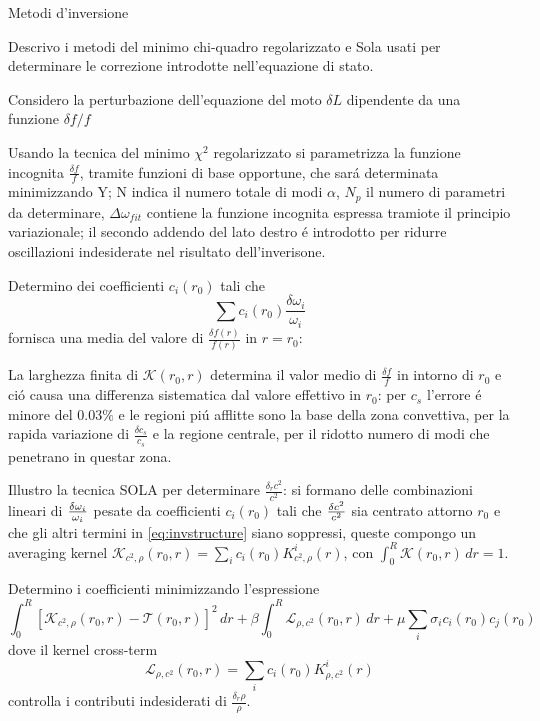 \documentclass[10pt,xcolor={usenames},fleqn,mathserif,serif]{beamer}
\begin{document}
\begin{wordonframe}{Metodi d'inversione}

Descrivo i metodi del minimo chi-quadro regolarizzato e Sola usati per determinare le correzione introdotte nell'equazione di stato.

Considero la perturbazione dell'equazione del moto $\delta L$ dipendente da una funzione $\delta f/f$

Usando la tecnica del minimo $\chi^2$ regolarizzato si parametrizza la funzione incognita $\frac{\delta f}{f}$, tramite funzioni di base opportune, che sar\'a determinata minimizzando Y; N indica il numero totale di modi $\alpha$, $N_p$ il numero di parametri da determinare, $\Delta\omega_{fit}$ contiene la funzione incognita espressa tramiote il principio variazionale; il secondo addendo del lato destro \'e introdotto per ridurre oscillazioni indesiderate nel risultato dell'inverisone.


Determino dei coefficienti $c_i(r_0)$ tali che \[\sum c_i(r_0)\frac{\delta\omega_i}{\omega_i}\] fornisca una media del valore di $\frac{\delta f(r)}{f(r)}$ in $r=r_0$:

La larghezza finita di $\mathcal{K}(r_0,r)$ determina il valor medio di $\frac{\delta f}{f}$ in intorno di $r_0$ e ci\'o causa una differenza sistematica  dal valore effettivo in $r_0$: per $c_s$ l'errore \'e minore del $0.03\%$ e le regioni pi\'u afflitte sono la base della zona convettiva, per la rapida variazione di $\frac{\delta c_s}{c_s}$ e la regione centrale, per il ridotto numero di modi che penetrano in questar zona.

Illustro la tecnica SOLA per determinare $\frac{\delta_rc^2}{c^2}$: si formano delle combinazioni lineari di $\frac{\delta \omega_i}{\omega_i}$ pesate da coefficienti $c_i(r_0)$ tali che $\frac{\delta c^2}{c^2}$ sia centrato attorno $r_0$ e che gli altri termini in \eqref{eq:invstructure} siano soppressi, queste compongo un averaging kernel $\mathcal{K}_{c^2,\rho}(r_0,r)=\sum_ic_i(r_0)K_{c^2,\rho}^i(r)$, con $\int_0^R\mathcal{K}(r_0,r)\,dr=1$.


Determino i coefficienti minimizzando l'espressione
\begin{equation}
\int_0^R[\mathcal{K}_{c^2,\rho}(r_0,r)-\mathcal{T}(r_0,r)]^2\,dr+\beta\int_0^R\mathcal{L}_{\rho,c^2}(r_0,r)\,dr+\mu\sum_i\sigma_ic_i(r_0)c_j(r_0)
\end{equation}
dove il kernel cross-term
\begin{equation}
\mathcal{L}_{\rho,c^2}(r_0,r)=\sum_ic_i(r_0)K_{\rho,c^2}^i(r)
\end{equation}
controlla i contributi indesiderati di $\frac{\delta_r\rho}{\rho}$.

\end{wordonframe}
\end{document}
